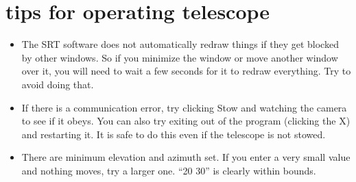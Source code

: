 \documentclass{article}
\begin{document}
\section{tips for operating telescope}

\begin{itemize}
	\item The SRT software does not automatically redraw things if they get blocked by other windows. So if you minimize the window or move another window over it, you will need to wait a few seconds for it to redraw everything. Try to avoid doing that.
	
	\item If there is a communication error, try clicking Stow and watching the camera to see if it obeys. You can also try exiting out of the program (clicking the X) and restarting it. It is safe to do this even if the telescope is not stowed.
	
	\item There are minimum elevation and azimuth set. If you enter a very small value and nothing moves, try a larger one. ``20 30'' is clearly within bounds.
\end{itemize}
	
\end{document}

